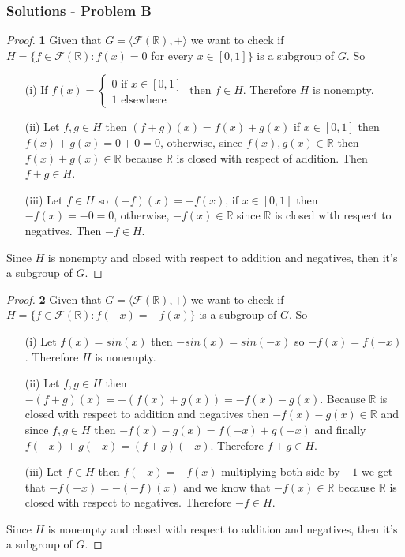 \documentclass[11pt]{article}
\begin{document}
	\subsubsection*{Solutions - Problem B}
	\begin{proof}{\textbf{1}}
		Given that $G = \langle \mathscr{F}(\mathbb{R}), + \rangle$ we want to check if \\
		$H = \{f \in \mathscr{F}(\mathbb{R}): f(x) = 0$ for every $x \in [0,1]\}$ is a subgroup of $G$. So
		\begin{itemize}
			\item[(i)] If
				$f(x) = \begin{cases}
					0 \text{ if } x \in [0,1] \\
					1 \text{ elsewhere}					
				\end{cases}$
				then $f \in H$. Therefore $H$ is nonempty.
			\item[(ii)] Let $f,g \in H$ then $(f+g)(x) = f(x) + g(x)$ if $x \in [0,1]$ then $f(x)+g(x)= 0+0 = 0$, otherwise, since $f(x),g(x) \in \mathbb{R}$ then $f(x)+g(x) \in \mathbb{R}$ because $\mathbb{R}$ is closed with respect of addition. Then $f+g \in H$.
			\item[(iii)] Let $f \in H$ so $(-f)(x)=-f(x)$, if $x \in [0,1]$ then $-f(x) =-0=0$, otherwise, $-f(x) \in \mathbb{R}$ since $\mathbb{R}$ is closed with respect to negatives. Then $-f \in H$.
		\end{itemize}
		Since $H$ is nonempty and closed with respect to addition and negatives, then it's a subgroup of $G$.
	\end{proof}
	\begin{proof}{\textbf{2}}
		Given that $G = \langle \mathscr{F}(\mathbb{R}), + \rangle$ we want to check if \\
		$H = \{f \in \mathscr{F}(\mathbb{R}): f(-x) = -f(x)\}$ is a subgroup of $G$. So
		\begin{itemize}
			\item[(i)] Let $f(x)=sin(x)$ then $-sin(x)=sin(-x)$ so $-f(x)=f(-x)$. Therefore $H$ is nonempty.
			\item[(ii)] Let $f,g \in H$ then $-(f+g)(x)=-(f(x)+g(x))=-f(x)-g(x)$. Because $\mathbb{R}$ is closed with respect to addition and negatives then $-f(x)-g(x) \in \mathbb{R}$ and since $f,g \in H$ then $-f(x)-g(x)=f(-x)+g(-x)$ and finally $f(-x)+g(-x)=(f+g)(-x)$. Therefore $f+g \in H$.
			\item[(iii)] Let $f \in H$ then $f(-x)=-f(x)$ multiplying both side by $-1$ we get that $-f(-x)=-(-f)(x)$ and we know that $-f(x) \in \mathbb{R}$ because $\mathbb{R}$ is closed with respect to negatives. Therefore $-f \in H$.
		\end{itemize}
		Since $H$ is nonempty and closed with respect to addition and negatives, then it's a subgroup of $G$.
	\end{proof}
\end{document}
